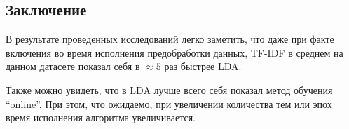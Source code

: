 \subsection*{Заключение}

В результате проведенных исследований легко заметить, что даже при факте включения во время исполнения предобработки данных, TF-IDF в среднем на данном датасете показал себя в $\approx 5$ раз быстрее LDA.

Также можно увидеть, что в LDA лучше всего себя показал метод обучения ``online''. При этом, что ожидаемо, при увеличении количества тем или эпох время исполнения алгоритма увеличивается.
